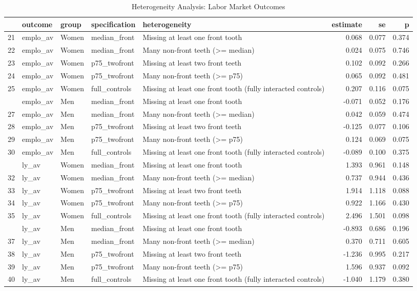 \begin{table}

\caption{Heterogeneity Analysis: Labor Market Outcomes}
\centering
\begin{tabular}[t]{lllllrrr}
\toprule
  & outcome & group & specification & heterogeneity & estimate & se & p\\
\midrule
21 & emplo\_av & Women & median\_front & Missing at least one front tooth & 0.068 & 0.077 & 0.374\\
22 & emplo\_av & Women & median\_front & Many non-front teeth (>= median) & 0.024 & 0.075 & 0.746\\
23 & emplo\_av & Women & p75\_twofront & Missing at least two front teeth & 0.102 & 0.092 & 0.266\\
24 & emplo\_av & Women & p75\_twofront & Many non-front teeth (>= p75) & 0.065 & 0.092 & 0.481\\
25 & emplo\_av & Women & full\_controls & Missing at least one front tooth (fully interacted controls) & 0.207 & 0.116 & 0.075\\
\addlinespace
26 & emplo\_av & Men & median\_front & Missing at least one front tooth & -0.071 & 0.052 & 0.176\\
27 & emplo\_av & Men & median\_front & Many non-front teeth (>= median) & 0.042 & 0.059 & 0.474\\
28 & emplo\_av & Men & p75\_twofront & Missing at least two front teeth & -0.125 & 0.077 & 0.106\\
29 & emplo\_av & Men & p75\_twofront & Many non-front teeth (>= p75) & 0.124 & 0.069 & 0.075\\
30 & emplo\_av & Men & full\_controls & Missing at least one front tooth (fully interacted controls) & -0.089 & 0.100 & 0.375\\
\addlinespace
31 & ly\_av & Women & median\_front & Missing at least one front tooth & 1.393 & 0.961 & 0.148\\
32 & ly\_av & Women & median\_front & Many non-front teeth (>= median) & 0.737 & 0.944 & 0.436\\
33 & ly\_av & Women & p75\_twofront & Missing at least two front teeth & 1.914 & 1.118 & 0.088\\
34 & ly\_av & Women & p75\_twofront & Many non-front teeth (>= p75) & 0.922 & 1.166 & 0.430\\
35 & ly\_av & Women & full\_controls & Missing at least one front tooth (fully interacted controls) & 2.496 & 1.501 & 0.098\\
\addlinespace
36 & ly\_av & Men & median\_front & Missing at least one front tooth & -0.893 & 0.686 & 0.196\\
37 & ly\_av & Men & median\_front & Many non-front teeth (>= median) & 0.370 & 0.711 & 0.605\\
38 & ly\_av & Men & p75\_twofront & Missing at least two front teeth & -1.236 & 0.995 & 0.217\\
39 & ly\_av & Men & p75\_twofront & Many non-front teeth (>= p75) & 1.596 & 0.937 & 0.092\\
40 & ly\_av & Men & full\_controls & Missing at least one front tooth (fully interacted controls) & -1.040 & 1.179 & 0.380\\
\bottomrule
\end{tabular}
\end{table}

